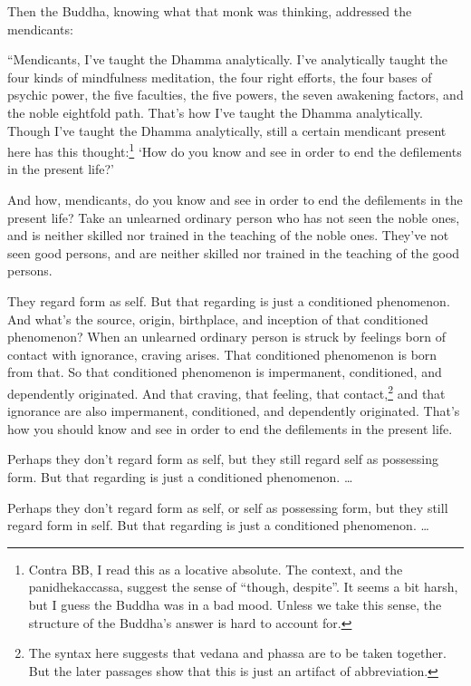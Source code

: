 \documentclass[12pt,openany]{book}%
\begin{document}
Then the Buddha, knowing what that monk was thinking, addressed the mendicants: 

“Mendicants, I’ve taught the Dhamma analytically. I’ve analytically taught the four kinds of mindfulness meditation, the four right efforts, the four bases of psychic power, the five faculties, the five powers, the seven awakening factors, and the noble eightfold path. That’s how I’ve taught the Dhamma analytically. Though I’ve taught the Dhamma analytically, still a certain mendicant present here has this thought:\footnote{Contra BB, I read this as a locative absolute. The context, and the panidhekaccassa, suggest the sense of “though, despite”. It seems a bit harsh, but I guess the Buddha was in a bad mood. Unless we take this sense, the structure of the Buddha’s answer is hard to account for. } ‘How do you know and see in order to end the defilements in the present life?’ 

And how, mendicants, do you know and see in order to end the defilements in the present life? Take an unlearned ordinary person who has not seen the noble ones, and is neither skilled nor trained in the teaching of the noble ones. They’ve not seen good persons, and are neither skilled nor trained in the teaching of the good persons. 

They regard form as self. But that regarding is just a conditioned phenomenon. And what’s the source, origin, birthplace, and inception of that conditioned phenomenon? When an unlearned ordinary person is struck by feelings born of contact with ignorance, craving arises. That conditioned phenomenon is born from that. So that conditioned phenomenon is impermanent, conditioned, and dependently originated. And that craving, that feeling, that contact,\footnote{The syntax here suggests that vedana and phassa are to be taken together. But the later passages show that this is just an artifact of abbreviation. } and that ignorance are also impermanent, conditioned, and dependently originated. That’s how you should know and see in order to end the defilements in the present life. 

Perhaps they don’t regard form as self, but they still regard self as possessing form. But that regarding is just a conditioned phenomenon. … 

Perhaps they don’t regard form as self, or self as possessing form, but they still regard form in self. But that regarding is just a conditioned phenomenon. … 
\end{document}
